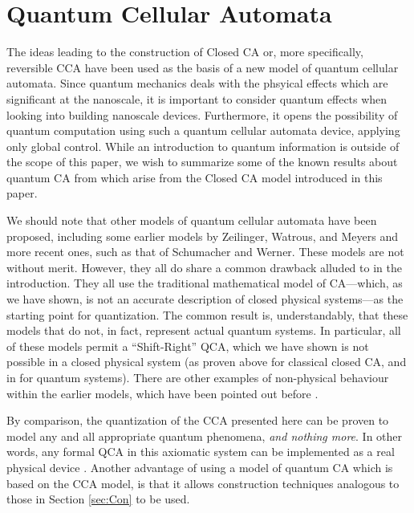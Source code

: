 \documentclass{jca}
\begin{document}
\section{Quantum Cellular Automata}\label{sec:QCA}


The ideas leading to the construction of Closed CA or, more specifically, reversible CCA have been used as the basis of a new model of quantum cellular automata\cite{cp07}.
Since quantum mechanics deals with the phsyical effects which are significant at the nanoscale, it is important to consider quantum effects when looking into building nanoscale devices\cite{cp06}.
Furthermore, it opens the possibility of quantum computation using such a quantum cellular automata device, applying only global control.
While an introduction to quantum information is outside of the scope of this paper, we wish to summarize some of the known results about quantum CA from \cite{cp07} which arise from the Closed CA model introduced in this paper.

We should note that other models of quantum cellular automata have been proposed, including some earlier models by Zeilinger\cite{grossing88}, Watrous\cite{watrous}, and Meyers\cite{meyer96} and more recent ones, such as that of Schumacher and Werner\cite{sw04}.
These models are not without merit.
However, they all do share a common drawback alluded to in the introduction. 
They all use the traditional mathematical model of CA---which, as we have shown, is not an accurate description of closed physical systems---as the starting point for quantization.
The common result is, understandably, that these models that do not, in fact, represent actual quantum systems.
In particular, all of these models permit a ``Shift-Right'' QCA, which we have shown is not possible in a closed physical system (as proven above for classical closed CA, and in \cite{cp07} for quantum systems).
There are other examples of non-physical behaviour within the earlier models, which have been pointed out before \cite{sw04,cp07}.

By comparison, the quantization of the CCA presented here can be proven to model any and all appropriate quantum phenomena, \emph{and nothing more}. 
In other words, any formal QCA in this axiomatic system can be implemented as a real physical device \cite{cp07}.
Another advantage of using a model of quantum CA which is based on the CCA model, is that it allows construction techniques analogous to those in Section \ref{sec:Con} to be used.
\end{document}
